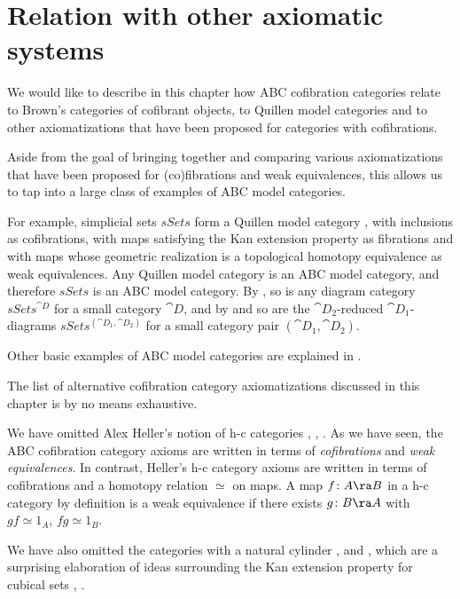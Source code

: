 \chapter{Relation with other axiomatic systems}
\label{chap:modcatcatcofobj}

We would like to describe in this chapter how ABC cofibration categories relate to Brown's categories of cofibrant objects, to Quillen model categories and to other axiomatizations that have been proposed for categories with cofibrations. 

Aside from the goal of bringing together and comparing various axiomatizations that have been proposed for (co)fibrations and weak equivalences, this allows us to tap into a large class of examples of ABC model categories. 

For example, simplicial sets $sSets$ form a Quillen model category \cite{Quillen1}, with inclusions as cofibrations, with maps satisfying the Kan extension property as fibrations and with maps whose geometric realization is a topological homotopy equivalence as weak equivalences. Any Quillen model category is an ABC model category, and therefore $sSets$ is an ABC model category. By , so is any diagram category $sSets^{\cat D}$ for a small category ${\cat D}$, and by  and  so are the ${\cat D}_2$-reduced ${\cat D}_1$-diagrams $sSets^{({\cat D}_1, {\cat D}_2)}$ for a small category pair $({\cat D}_1, {\cat D}_2)$.

Other basic examples of ABC model categories are explained in .

The list of alternative cofibration category axiomatizations discussed in this chapter is by no means exhaustive. 

We have omitted Alex Heller's notion of h-c categories \cite{HellerHC1}, \cite{HellerHC2}, \cite{HellerHC3}. As we have seen, the ABC cofibration category axioms are written in terms of {\it cofibrations} and {\it weak equivalences}.  In contrast, Heller's h-c category axioms are written in terms of cofibrations and a homotopy relation $\simeq$ on maps. A map $f \colon A \ra B$ in a h-c category by definition is a weak equivalence if there exists $g \colon B \ra A$ with $gf \simeq 1_A$, $fg \simeq 1_B$.

We have also omitted the categories with a natural cylinder \cite{Kamps}, \cite{Shitanda} and \cite{Kamps-Porter}, which are a surprising elaboration of ideas surrounding the Kan extension property for cubical sets \cite{Kan1}, \cite{Kan2}.



